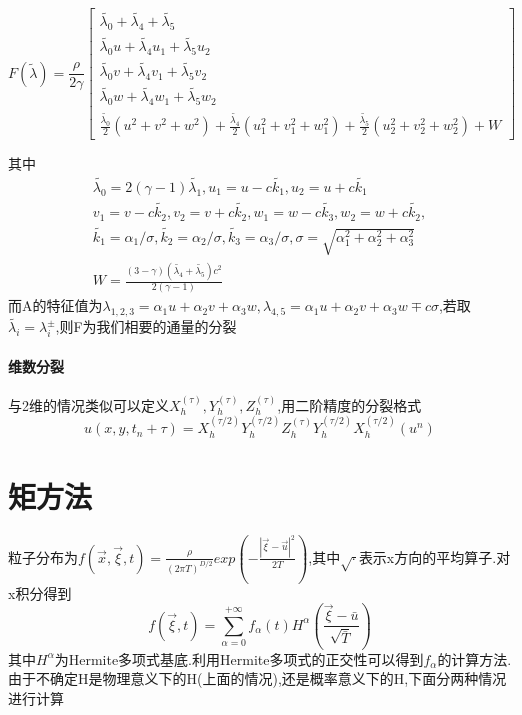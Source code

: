 \documentclass[UTF8]{ctexart}
\begin{document}
    \begin{equation*}
    F(\tilde{\lambda})=\frac{\rho}{2\gamma}\left[\begin{matrix}
                                             \tilde{\lambda_0}+\tilde{\lambda_4}+\tilde{\lambda_5} \\
                                             \tilde{\lambda_0}u+ \tilde{\lambda_4}u_1+ \tilde{\lambda_5}u_2 \\
                                             \tilde{\lambda_0}v+ \tilde{\lambda_4}v_1+ \tilde{\lambda_5}v_2\\
                                             \tilde{\lambda_0}w+ \tilde{\lambda_4}w_1+ \tilde{\lambda_5}w_2\\
                                             \frac{\tilde{\lambda_0}}{2}(u^2+v^2+w^2) + \frac{\tilde{\lambda_4}}{2}(u_1^2+v_1^2+w_1^2) +  \frac{\tilde{\lambda_5}}{2}(u_2^2+v_2^2+w_2^2) +W
                                           \end{matrix}\right]
  \end{equation*}

  其中
  \begin{equation*}
    \begin{matrix}
    \tilde{\lambda_0}=2(\gamma-1)\tilde{\lambda_1},u_1=u-c\tilde{k_1},u_2=u+c\tilde{k_1} \\
    v_1=v-c\tilde{k_2},v_2=v+c\tilde{k_2},w_1=w-c\tilde{k_3},w_2=w+c\tilde{k_2},\\
    \tilde{k_1}=\alpha_1/\sigma,\tilde{k_2}=\alpha_2/\sigma,\tilde{k_3}=\alpha_3/\sigma,\sigma=\sqrt{\alpha_1^2+\alpha_2^2+\alpha_3^2} \\
    W = \frac{(3-\gamma)(\tilde{\lambda_4}+\tilde{\lambda_5})c^2}{2(\gamma-1)}
   \end{matrix}
  \end{equation*}
  而A的特征值为$\lambda_{1,2,3}=\alpha_1 u + \alpha_2 v+\alpha_3w, \lambda_{4,5}=\alpha_1 u + \alpha_2 v  + \alpha_3 w \mp c \sigma  $,若取$\tilde{\lambda_i}=\lambda_i^{\pm}$,则F为我们相要的通量的分裂

  \paragraph{维数分裂}
  与2维的情况类似可以定义$X_h^{(\tau)},Y_h^{(\tau)},Z_h^{(\tau)}$,用二阶精度的分裂格式
    $$
    u(x,y,t_n+\tau)=X_h^{(\tau/2)}Y_h^{(\tau/2)}Z_h^{(\tau)}Y_h^{(\tau/2)}X_h^{(\tau/2)}(u^n)
    $$

    \section{矩方法}
    粒子分布为$f(\vec{x},\vec{\xi},t)=\frac{\rho}{(2\pi T)^{D/2}}exp(-\frac{|\vec{\xi}-\vec{u}|^2}{2T})$,其中$\sqrt{\cdot}$表示x方向的平均算子.对x积分得到
    $$
    f(\vec{\xi},t) = \sum_{\alpha=0}^{+\infty}f_{\alpha}(t)H^{\alpha}(\frac{\vec{\xi}-\bar{u}}{\sqrt{\bar{T}}})
    $$
    其中$H^{\alpha}$为Hermite多项式基底.利用Hermite多项式的正交性可以得到$f_{\alpha}$的计算方法.
    由于不确定H是物理意义下的H(上面的情况),还是概率意义下的H,下面分两种情况进行计算
\end{document}
